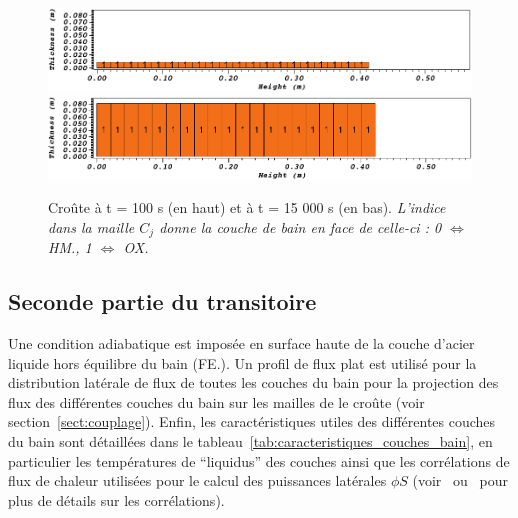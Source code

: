 \begin{figure}[H]
\centering
\includegraphics[width=\textwidth, keepaspectratio=true]{Figures/croute_100.png}\\
\includegraphics[width=\textwidth, keepaspectratio=true]{Figures/croute_15000.png}
\caption{Croûte à t = 100 s (en haut) et à t = 15 000 s (en bas). \textit{L'indice dans la maille $C_j$ donne la couche de bain en face de celle-ci : 0 $\Leftrightarrow$ HM., 1 $\Leftrightarrow$ OX.}}
\label{fig:croutes_1}
\end{figure}

\subsection{Seconde partie du transitoire}
\iffalse
Une condition adiabatique est imposée en surface haute de la couche d'acier liquide hors équilibre du bain (FE.). Un profil de flux plat est utilisé pour la distribution latérale de flux de toutes les couches du bain pour la projection des flux des différentes couches du bain sur les mailles de le croûte (voir section~\ref{sect:couplage}). Enfin, les caractéristiques utiles des différentes couches du bain sont détaillées dans le tableau~\ref{tab:caracteristiques_couches_bain}, en particulier les températures de ``liquidus'' des couches ainsi que les corrélations de flux de chaleur utilisées pour le calcul des puissances latérales $\phi S$ (voir~\cite{Bonnet1999} ou~\cite{Tourniaire2009a} pour plus de détails sur les corrélations).

